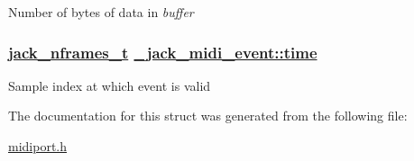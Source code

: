Number of bytes of data in {\em buffer\/} \hypertarget{struct__jack__midi__event_07cc694b9b3fc636710fa08b6922c42b}{
\subsubsection[time]{\setlength{\rightskip}{0pt plus 5cm}\hyperlink{types_8h_fe9972a13782c1e282747fdb4bc46f9c}{jack\_\-nframes\_\-t} \hyperlink{struct__jack__midi__event_07cc694b9b3fc636710fa08b6922c42b}{\_\-jack\_\-midi\_\-event::time}}}
\label{struct__jack__midi__event_07cc694b9b3fc636710fa08b6922c42b}


Sample index at which event is valid 

The documentation for this struct was generated from the following file:\begin{CompactItemize}
\item 
\hyperlink{midiport_8h}{midiport.h}\end{CompactItemize}
